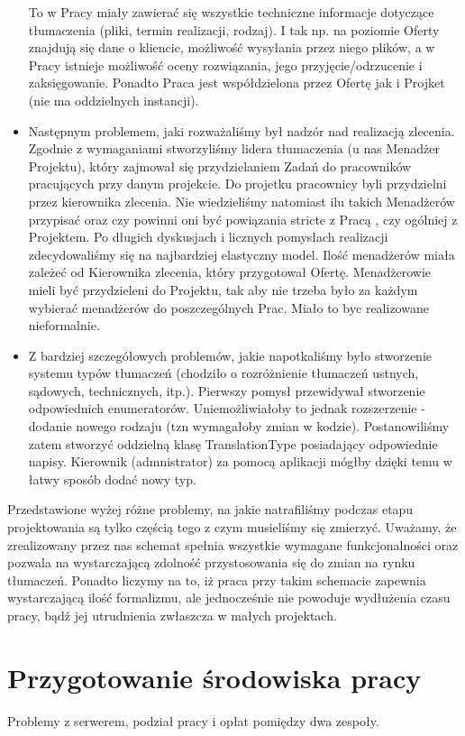 \documentclass[licencjacka]{pracamgr}
\begin{document}
\begin{itemize}
To w Pracy miały zawierać się wszystkie techniczne informacje dotyczące tłumaczenia (pliki, termin realizacji, rodzaj). I tak np. na poziomie Oferty  znajdują się dane o kliencie,
możliwość wysyłania przez niego plików, a w Pracy istnieje możliwość oceny rozwiązania, jego przyjęcie/odrzucenie i zaksięgowanie.
Ponadto Praca jest współdzielona przez Ofertę jak i Projket (nie ma oddzielnych instancji).
\item Następnym problemem, jaki rozważaliśmy był nadzór nad realizacją zlecenia. Zgodnie z wymaganiami stworzyliśmy lidera tłumaczenia (u nas Menadżer Projektu), 
który zajmował się przydzielaniem Zadań do pracowników pracujących przy danym projekcie. Do projetku pracownicy byli przydzielni przez kierownika zlecenia.
Nie wiedzieliśmy natomiast ilu takich Menadżerów przypisać oraz czy powinni oni być powiązania stricte z Pracą , czy ogólniej z Projektem. 
Po długich dyskusjach i licznych pomysłach realizacji zdecydowaliśmy się na najbardziej elastyczny model. Ilość menadżerów miała zależeć od Kierownika zlecenia, który przygotował Ofertę. 
Menadżerowie mieli być przydzieleni do Projektu, tak aby nie trzeba było za każdym wybierać menadżerów do poszczególnych Prac.
Miało to byc realizowane nieformalnie.
\item Z bardziej szczegółowych problemów, jakie napotkaliśmy było stworzenie systemu typów tłumaczeń (chodziło o rozróżnienie tłumaczeń ustnych, sądowych, technicznych, itp.).
Pierwszy pomysł przewidywał stworzenie odpowiednich enumeratorów. Uniemożliwiałoby to jednak rozszerzenie - dodanie nowego rodzaju (tzn wymagałoby zmian w kodzie). 
Postanowiliśmy zatem stworzyć oddzielną klasę TranslationType posiadający odpowiednie napisy. Kierownik (admnistrator) za pomocą aplikacji mógłby dzięki temu w łatwy sposób dodać nowy typ.
\end{itemize}
Przedstawione wyżej różne problemy, na jakie natrafiliśmy podczas etapu projektowania są tylko częścią tego z czym musieliśmy się zmierzyć. 
Uważamy, że zrealizowany przez nas schemat spełnia wszystkie wymagane funkcjonalności oraz pozwala na wystarczającą zdolność przystosowania się do zmian na rynku tłumaczeń.
Ponadto liczymy na to, iż praca przy takim schemacie zapewnia wystarczającą ilość formalizmu, ale jednocześnie nie powoduje wydłużenia czasu pracy, bądź jej utrudnienia zwłaszcza w małych projektach. 

 

\section{Przygotowanie środowiska pracy}
Problemy z serwerem, podział pracy i opłat pomiędzy dwa zespoły.
\end{document}
